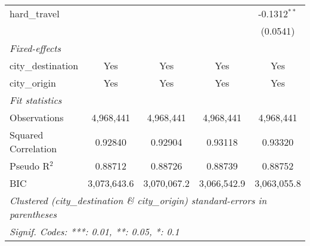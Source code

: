 \begin{tabular}{lcccc}
   hard\_travel        &                &                 &                 & -0.1312$^{**}$\\   
                       &                &                 &                 & (0.0541)\\   
   \midrule
   \emph{Fixed-effects}\\
   city\_destination   & Yes            & Yes             & Yes             & Yes\\  
   city\_origin        & Yes            & Yes             & Yes             & Yes\\  
   \midrule
   \emph{Fit statistics}\\
   Observations        & 4,968,441      & 4,968,441       & 4,968,441       & 4,968,441\\  
   Squared Correlation & 0.92840        & 0.92904         & 0.93118         & 0.93320\\  
   Pseudo R$^2$        & 0.88712        & 0.88726         & 0.88739         & 0.88752\\  
   BIC                 & 3,073,643.6    & 3,070,067.2     & 3,066,542.9     & 3,063,055.8\\  
   \midrule \midrule
   \multicolumn{5}{l}{\emph{Clustered (city\_destination \& city\_origin) standard-errors in parentheses}}\\
   \multicolumn{5}{l}{\emph{Signif. Codes: ***: 0.01, **: 0.05, *: 0.1}}\\
\end{tabular}
\par\endgroup



